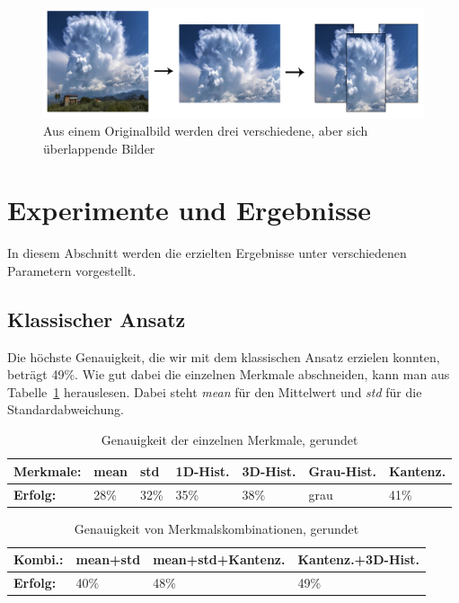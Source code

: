 \documentclass[a4,german]{article}
\begin{document}
\begin{figure}[h!]
\centering
\includegraphics[width=\textwidth]{Augmentation}
\caption{Aus einem Originalbild werden drei verschiedene, aber sich überlappende Bilder}
    \label{fig:augmentation}
\end{figure}


\section{Experimente und Ergebnisse}
\label{sec:experimente}
In diesem Abschnitt werden die erzielten Ergebnisse unter verschiedenen Parametern vorgestellt.

\subsection{Klassischer Ansatz}%
Die höchste Genauigkeit, die wir mit dem klassischen Ansatz erzielen konnten, beträgt 49\%. Wie gut dabei die einzelnen Merkmale abschneiden, kann man aus Tabelle~\ref{tab:gen} herauslesen. Dabei steht \textit{mean} für den Mittelwert und \textit{std} für die Standardabweichung. 
\begin{table}[h]
\centering
\begin{tabular}{|l|l|l|l|l|l|l|}
 \hline
 \textbf{Merkmale:}&mean&std&1D-Hist.&3D-Hist.&Grau-Hist.&Kantenz.\\
 \hline
 \textbf{Erfolg:} & 28\% & 32\% & 35\% & 38\% & grau & 41\% \\
 \hline
\end{tabular}
\caption{Genauigkeit der einzelnen Merkmale, gerundet}
\label{tab:gen}
\end{table}

\begin{table}[h]
\centering
\begin{tabular}{|l|l|l|l|}
 \hline
 \textbf{Kombi.:}&mean+std&mean+std+Kantenz.&Kantenz.+3D-Hist.\\
 \hline
 \textbf{Erfolg:} & 40\% & 48\% & 49\% \\
 \hline
\end{tabular}
\caption{Genauigkeit von Merkmalskombinationen, gerundet}
\label{tab:gen2}
\end{table}
\end{document}

